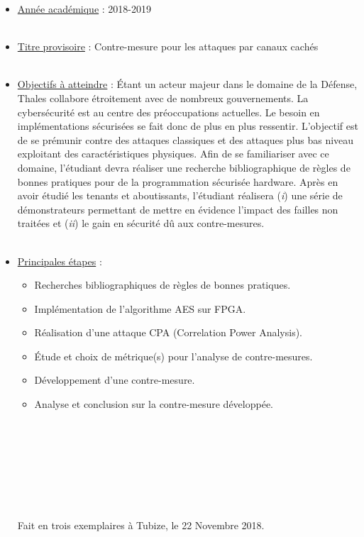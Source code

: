 \documentclass[oneside]{book}
\begin{document}
\vspace{1cm}
\begin{itemize}[label=$\bullet$]
\item \underline{Année académique} : 2018-2019 \\ \\
\item \underline{Titre provisoire} : Contre-mesure pour les attaques par canaux cachés \\ \\
\item \underline{Objectifs à atteindre} : Étant un acteur majeur dans le domaine de la Défense, Thales collabore étroitement avec de nombreux gouvernements. La cybersécurité est au centre des préoccupations actuelles. Le besoin en implémentations sécurisées se fait donc de plus en plus ressentir. L’objectif est de se prémunir contre des attaques classiques et des attaques plus bas niveau exploitant des caractéristiques physiques. Afin de se familiariser avec ce domaine, l’étudiant devra réaliser une recherche bibliographique de règles de bonnes pratiques pour de la programmation sécurisée hardware. Après en avoir étudié les tenants et aboutissants, l’étudiant réalisera (\textit{i}) une série de démonstrateurs permettant de mettre en évidence l’impact des failles non traitées et (\textit{ii}) le gain en sécurité dû aux contre-mesures. \\ \\
\item \underline{Principales étapes} : \begin{itemize}
\item  Recherches bibliographiques de règles de bonnes pratiques.
\item Implémentation de l’algorithme AES sur FPGA.
\item Réalisation d’une attaque CPA (Correlation Power Analysis).
\item Étude et choix de métrique(s) pour l’analyse de contre-mesures.
\item Développement d’une contre-mesure.
\item Analyse et conclusion sur la contre-mesure développée. \\ \\ \\ \\ \\ \\ \\ \\
\end{itemize}

\hfill Fait en trois exemplaires à Tubize, le 22 Novembre 2018.
\end{itemize}
\end{document}
